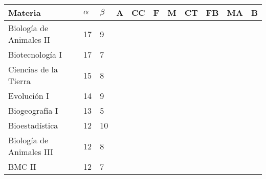 \onecolumn
\begin{table}[h!]
\centering
\begin{tabular}{l|ll|llllllll}
\textbf{Materia}             & $\alpha$ & $\beta$             & \textbf{A}        & \textbf{CC}        & \textbf{F}        & \textbf{M}        & \textbf{CT}        & \textbf{FB}        & \textbf{MA}        & \textbf{B}        \\\hline
Biología de Animales II      & 17       & 9                   &                     &                     &                     &                     &                     &                     &                     & \cellcolor{blue!25} \\
Biotecnología I              & 17       & 7                   &                     &                     &                     &                     &                     &                     &                     & \cellcolor{blue!25} \\
Ciencias de la Tierra        & 15       & 8                   &                     &                     &                     &                     &                     &                     &                     & \cellcolor{blue!25} \\
Evolución I                  & 14       & 9                   &                     &                     &                     &                     &                     &                     &                     & \cellcolor{blue!25} \\
Biogeografía I               & 13       & 5                   &                     &                     &                     &                     &                     &                     &                     & \cellcolor{blue!25} \\
Bioestadística               & 12       & 10                  &                     &                     &                     &                     &                     &                     &                     & \cellcolor{blue!25} \\
Biología de Animales III     & 12       & 8                   &                     &                     &                     &                     &                     &                     &                     & \cellcolor{blue!25} \\
BMC II                       & 12       & 7                   &                     &                     &                     &                     &                     &                     &                     & \cellcolor{blue!25} \\

\end{tabular}
\end{table}
